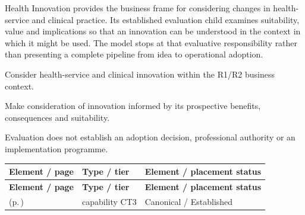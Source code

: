 Health Innovation provides the business frame for considering changes in health-service and clinical practice. Its established evaluation child examines suitability, value and implications so that an innovation can be understood in the context in which it might be used. The model stops at that evaluative responsibility rather than presenting a complete pipeline from idea to operational adoption.



Consider health-service and clinical innovation within the R1/\allowbreak{}R2 business context.



Make consideration of innovation informed by its prospective benefits, consequences and suitability.



Evaluation does not establish an adoption decision, professional authority or an implementation programme.


\begingroup\small\setlength{\TableWidth}{\dimexpr\linewidth-6\tabcolsep-4\arrayrulewidth\relax}
\begin{longtable}{|>{\raggedright\arraybackslash}p{0.52\TableWidth}|>{\raggedright\arraybackslash}p{0.2\TableWidth}|>{\raggedright\arraybackslash}p{0.28\TableWidth}|}
\hline\rowcolor{TableHead}\textbf{Element / page} & \textbf{Type / tier} & \textbf{Element / placement status}\\\hline\endfirsthead
\hline\rowcolor{TableHead}\textbf{Element / page} & \textbf{Type / tier} & \textbf{Element / placement status}\\\hline\endhead
\hline\endfoot
\nameref{cap:bc-health-innovation-evaluation} (p.\,\pageref{cap:bc-health-innovation-evaluation}) & capability CT3 & Canonical / Established\\\hline
\end{longtable}\endgroup

